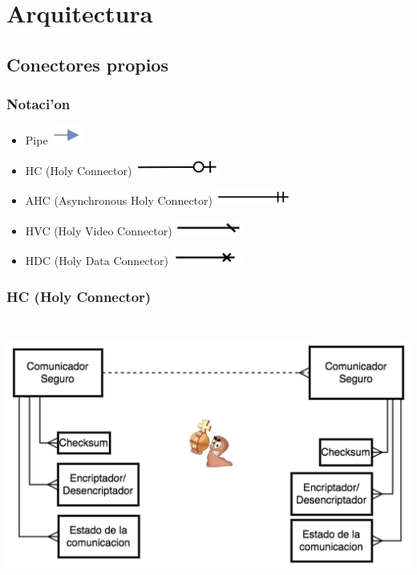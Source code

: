 \section{Arquitectura}
\subsection{Conectores propios}
\subsubsection{Notaci'on}

\begin{itemize}
\item Pipe \includegraphics[height=0.6cm]{diagramas/NPIPE} 
\item HC (Holy Connector) \includegraphics[height=0.5cm]{diagramas/NHC} 
\item AHC (Asynchronous Holy Connector) \includegraphics[height=0.5cm]{diagramas/NHCCA}
\item HVC (Holy Video Connector) \includegraphics[height=0.5cm]{diagramas/NHVC} 
\item HDC (Holy Data Connector) \includegraphics[height=0.5cm]{diagramas/NHDC} 

\end{itemize}

\subsubsection{HC (Holy Connector)}

\includegraphics[height=9cm]{diagramas/HC} 

